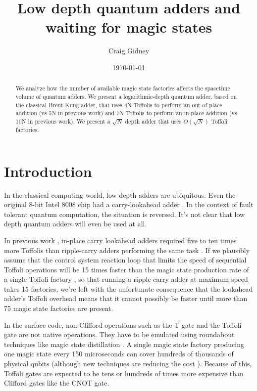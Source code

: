 \documentclass[onecolumn,unpublished]{quantumarticle}
\title{Low depth quantum adders and waiting for magic states}
\date{\today}
\author{Craig Gidney}
\affiliation{Google Inc., Santa Barbara, California 93117, USA}
\theoremstyle{definition}
\theoremstyle{definition}
\theoremstyle{definition}
\begin{document}
\maketitle

\begin{abstract}
    We analyze how the number of available magic state factories affects the spacetime volume of quantum adders.
    We present a logarithmic-depth quantum adder, based on the classical Brent-Kung adder, that uses 4N Toffolis to perform an out-of-place addition (vs 5N in previous work) and 7N Toffolis to perform an in-place addition (vs 10N in previous work).
    We present a $\sqrt{N}$ depth adder that uses $O(\sqrt{N})$ Toffoli factories.
\end{abstract}

\section{Introduction}

In the classical computing world, low depth adders are ubiquitous.
Even the original 8-bit Intel 8008 chip had a carry-lookahead adder \cite{shirriff2020reverseengineer8008}.
In the context of fault tolerant quantum computation, the situation is reversed.
It's not clear that low depth quantum adders will even be used at all.

In previous work \cite{draper2004lookaheadadder}, in-place carry lookahead adders required five to ten times more Toffolis than ripple-carry adders performing the same task \cite{cuccaro2004adder,gidney2018halving}.
If we plausibly assume that the control system reaction loop that limits the speed of sequential Toffoli operations will be 15 times faster than the magic state production rate of a single Toffoli factory \cite{gidney2019autoccz}, so that running a ripple carry adder at maximum speed takes 15 factories, we're left with the unfortunate consequence that the lookahead adder's Toffoli overhead means that it cannot possibly be faster until more than 75 magic state factories are present.

In the surface code, non-Clifford operations such as the T gate and the Toffoli gate are not native operations.
They have to be emulated using roundabout techniques like magic state distillation \cite{bravyi2005magicstate}.
A single magic state factory producing one magic state every 150 microseconds can cover hundreds of thousands of physical qubits \cite{gidney2019catalyzed} (although new techniques are reducing the cost \cite{litinski2019magicnotcostly}).
Because of this, Toffoli gates are expected to be tens or hundreds of times more expensive than Clifford gates like the CNOT gate.
\end{document}
